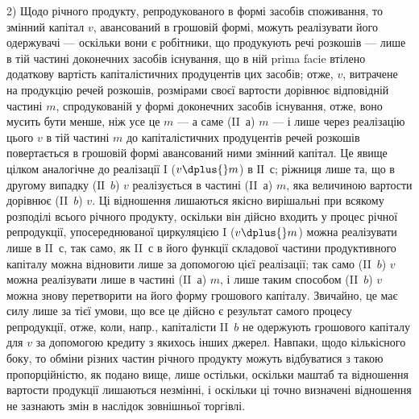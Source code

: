 2) Щодо річного продукту, репродукованого в формі засобів споживання,
то змінний капітал $v$, авансований в грошовій формі, можуть реалізувати
його одержувачі — оскільки вони є робітники, що продукують
речі розкошів — лише в тій частині доконечних засобів існування, що в
ній prima facie втілено додаткову вартість капіталістичних продуцентів
цих засобів; отже, $v$, витрачене на продукцію речей розкошів, розмірами
своєї вартости дорівнює відповідній частині $m$, спродукованій у
формі доконечних засобів існування, отже, воно мусить бути менше, ніж
усе це $m$ — а саме (II~$а$) $m$ — і лише через реалізацію цього $v$ в тій частині
$m$ до капіталістичних продуцентів речей розкошів повертається в грошовій
формі авансований ними змінний капітал. Це явище цілком аналогічне
до реалізації I ($v \dplus{} m$) в ІІ~$с$; ріжниця лише та, що в другому випадку
(IІ~$b$) $v$ реалізується в частині (II~$а$) $m$, яка величиною вартости дорівнює
(II~$b$) $v$. Ці відношення лишаються якісно вирішальні при всякому
розподілі всього річного продукту, оскільки він дійсно входить у процес
річної репродукції, упосереднюваної циркуляцією I ($v \dplus{} m$) можна реалізувати
лише в II~$с$, так само, як II~$с$ в його функції складової частини
продуктивного капіталу можна відновити лише за допомогою цієї реалізації;
так само (II~$b$) $v$ можна реалізувати лише в частині (II~$а$) $m$, і лише
таким способом (II~$b$) $v$ можна знову перетворити на його форму грошового
капіталу. Звичайно, це має силу лише за тієї умови, що все це дійсно
є результат самого процесу репродукції, отже, коли, напр., капіталісти
II~$b$ не одержують грошового капіталу для $v$ за допомогою кредиту з
якихось інших джерел. Навпаки, щодо кількісного боку, то обміни різних
частин річного продукту можуть відбуватися з такою пропорційністю, як
подано вище, лише остільки, оскільки маштаб та відношення вартости
продукції лишаються незмінні, і оскільки ці точно визначені відношення
не зазнають змін в наслідок зовнішньої торгівлі.

